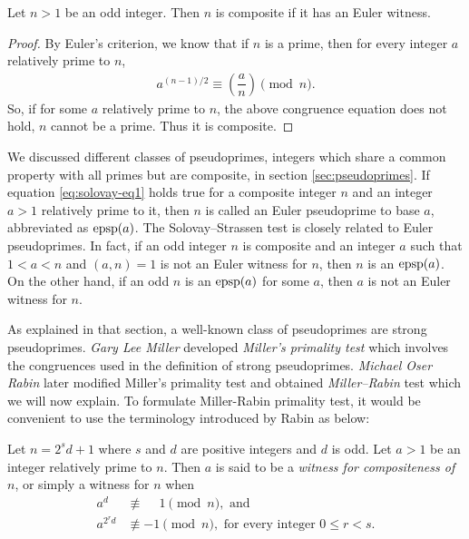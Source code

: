 \documentclass{subfiles}
\begin{document}
		\begin{theorem}
			Let $n>1$ be an odd integer. Then $n$ is composite if it has an Euler witness.
		\end{theorem}

		\begin{proof}
			By Euler's criterion, we know that if $n$ is a prime, then for every integer $a$ relatively prime to $n$,
				\begin{align}
					a^{(n-1)/2}  \equiv \left(\dfrac{a}{n}\right) \pmod n. \label{eq:solovay-eq1}
				\end{align}
			So, if for some $a$ relatively prime to $n$, the above congruence equation does not hold, $n$ cannot be a prime. Thus it is composite.
		\end{proof}

		\begin{remark}
					We discussed different classes of pseudoprimes, integers which share a common property with all primes but are composite, in section \eqref{sec:pseudoprimes}. If equation \eqref{eq:solovay-eq1} holds true for a composite integer $n$ and an integer $a>1$ relatively prime to it, then $n$ is called an Euler pseudoprime to base $a$, abbreviated as $\operatorname{epsp}(a)$. The Solovay--Strassen test is closely related to Euler pseudoprimes. In fact, if an odd integer $n$ is composite and an integer $a$ such that $1<a<n$ and $(a,n)=1$ is not an Euler witness for $n$, then $n$ is an $\operatorname{epsp}(a)$. On the other hand, if an odd $n$ is an $\operatorname{epsp}(a)$ for some $a$, then $a$ is not an Euler witness for $n$.
		\end{remark}

	 As explained in that section, a well-known class of pseudoprimes are strong pseudoprimes. \textit{Gary Lee Miller} developed \textit{Miller's primality test} which involves the congruences used in the definition of strong pseudoprimes. \textit{Michael Oser Rabin} later modified Miller's primality test and obtained \textit{Miller--Rabin} test which we will now explain. To formulate Miller-Rabin primality test, it would be convenient to use the terminology introduced by Rabin as below:

		\begin{definition}
			Let $n=2^sd+1$ where $s$ and $d$ are positive integers and $d$ is odd. Let $a>1$ be an integer relatively prime to $n$. Then $a$ is said to be a \textit{witness for compositeness of $n$}, or simply a witness for $n$ when
				\begin{align*}
				a^d &\not\equiv \phantom{-} 1 \pmod n, \text{ and}\\
				a^{2^rd} &\not\equiv -1 \pmod n, \text{ for every integer } 0 \leq r <s.
				\end{align*}
		\end{definition}
\end{document}
